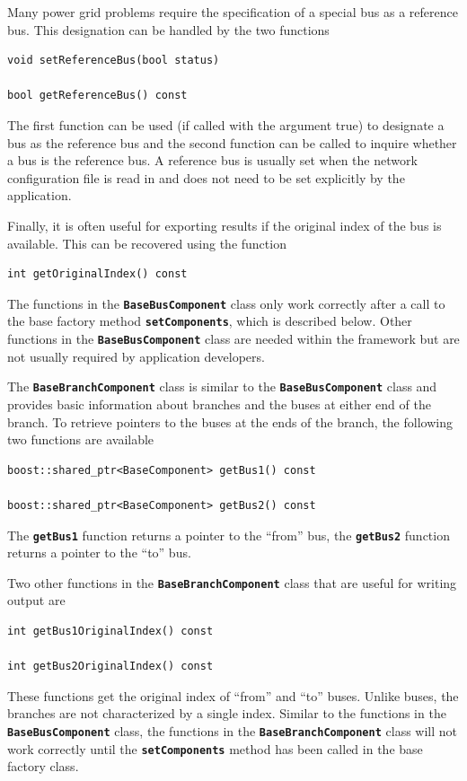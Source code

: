 Many power grid problems require the specification of a special bus as a reference bus. This designation can be handled by the two functions

{
\color{red}
\begin{Verbatim}[fontseries=b]
void setReferenceBus(bool status)

bool getReferenceBus() const
\end{Verbatim}
}

The first function can be used (if called with the argument true) to designate a bus as the reference bus and the second function can be called to inquire whether a bus is the reference bus. A reference bus is usually set when the network configuration file is read in and does not need to be set explicitly by the application.

Finally, it is often useful for exporting results if the original index of the bus is available. This can be recovered using the function

{
\color{red}
\begin{Verbatim}[fontseries=b]
int getOriginalIndex() const
\end{Verbatim}
}

The functions in the \texttt{\textbf{BaseBusComponent}} class only work correctly after a call to the base factory method \texttt{\textbf{setComponents}}, which is described below. Other functions in the \texttt{\textbf{BaseBusComponent}} class are needed within the framework but are not usually required by application developers.

The \texttt{\textbf{BaseBranchComponent}} class is similar to the \texttt{\textbf{BaseBusComponent}} class and provides basic information about branches and the buses at either end of the branch. To retrieve pointers to the buses at the ends of the branch, the following two functions are available

{
\color{red}
\begin{Verbatim}[fontseries=b]
boost::shared_ptr<BaseComponent> getBus1() const

boost::shared_ptr<BaseComponent> getBus2() const
\end{Verbatim}
}

The \texttt{\textbf{getBus1}} function returns a pointer to the ``from'' bus, the \texttt{\textbf{getBus2}} function returns a pointer to the ``to'' bus.

Two other functions in the \texttt{\textbf{BaseBranchComponent}} class that are useful for writing output are

{
\color{red}
\begin{Verbatim}[fontseries=b]
int getBus1OriginalIndex() const

int getBus2OriginalIndex() const
\end{Verbatim}
}

These functions get the original index of ``from'' and ``to'' buses. Unlike buses, the branches are not characterized by a single index. Similar to the functions in the \texttt{\textbf{BaseBusComponent}} class, the functions in the \texttt{\textbf{BaseBranchComponent}} class will not work correctly until the \texttt{\textbf{setComponents}} method has been called in the base factory class.

